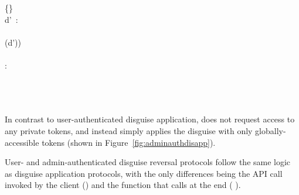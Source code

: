 \begin{figure*}[t!]
{\<\<  \gets \{\}\\
\<\< \pcforeach d'~: \\
    \<\< \quad{}\\
    \<\<\quad\quad{}(d'))\\ 
\<\< \pcendforeach\\
\<\< \pcforeach {} \in {}: \\
\<\< \quad{}\\
\<\< \quad \quad {}\\ 
\<\< \pcendforeach\\
\<\< 
}
    \caption{\textbf{User-Authenticated disguise application.}}
    \label{fig:userauthdisapp}
\end{figure*}

In contrast to user-authenticated disguise application, \sys does not request access to any private
tokens, and instead simply applies the disguise with only globally-accessible tokens (shown in Figure~\ref{fig:adminauthdisapp}).

\begin{figure*}[t!]
    \caption{\textbf{Admin-authenticated disguise application}. }
    \label{fig:adminauthdisapp}
\end{figure*}

User- and admin-authenticated disguise
reversal protocols follow the same logic as disguise application protocols, with the only
differences being the API call invoked by the client 
() and the
function that \sys calls at the end ( ).
\fi
\fi
